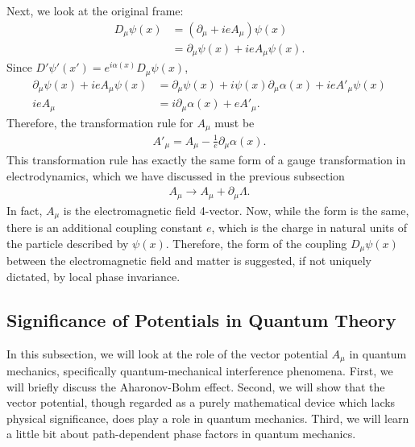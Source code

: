 \documentclass[a4paper,11pt]{article}
\numberwithin{equation}{section}
\theoremstyle{definition}
\newcommand{\p}{\partial}
\begin{document}
Next, we look at the original frame:
\begin{align}
D_\mu \psi(x) &= \left(\p_\mu + ieA_\mu \right)\psi(x)\\
&= \p_\mu\psi(x) + ieA_\mu \psi(x).
\end{align}
Since $D'\psi'(x') = e^{i\alpha(x)}D_\mu\psi(x)$,
\begin{align}
\p_\mu\psi(x) + ieA_\mu \psi(x) &= \p_\mu \psi(x) + i\psi(x)\p_\mu \alpha(x) + ie A'_\mu \psi(x)\\
ieA_\mu &= i\p_\mu \alpha(x) + e A'_\mu.
\end{align}
Therefore, the transformation rule for $A_\mu$ must be
\begin{align}
A'_\mu = A_\mu - \frac{1}{e}\p_\mu\alpha(x).
\end{align}
This transformation rule has exactly the same form of a gauge transformation in electrodynamics, which we have discussed in the previous subsection
\begin{align}
A_\mu \to A_\mu + \p_\mu \Lambda.
\end{align} 
In fact, $A_\mu$ is the electromagnetic field 4-vector. Now, while the form is the same, there is an additional coupling constant $e$, which is the charge in natural units of the particle described by $\psi(x)$. Therefore, the form of the coupling $D_\mu\psi(x)$ between the electromagnetic field and matter is suggested, if not uniquely dictated, by local phase invariance. 



\subsection{Significance of Potentials in Quantum Theory}
In this subsection, we will look at the role of the vector potential $A_\mu$ in quantum mechanics, specifically quantum-mechanical interference phenomena. First, we will briefly discuss the Aharonov-Bohm effect. Second, we will show that the vector potential, though regarded as a purely mathematical device which lacks physical significance, does play a role in quantum mechanics. Third, we will learn a little bit about path-dependent phase factors in quantum mechanics. 
\end{document}
